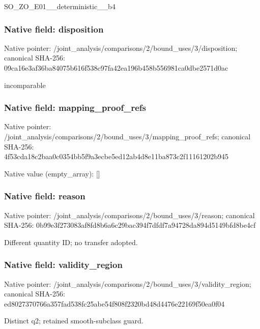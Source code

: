 \documentclass[10pt,a4paper]{article}
\begin{document}
\begingroup\raggedright\sloppy SO\_\allowbreak{}ZO\_\allowbreak{}E01\_\allowbreak{}\_\allowbreak{}deterministic\_\allowbreak{}\_\allowbreak{}b4\par\endgroup

\subsubsection{Native field: disposition}
Native pointer: /joint\_\allowbreak{}analysis/comparisons/2/bound\_\allowbreak{}uses/3/disposition; canonical SHA-256: 09ca16e3af36ba84075b616f538c97fa42ea196b458b556981ca0dbe2571d0ac

\begingroup\raggedright\sloppy incomparable\par\endgroup

\subsubsection{Native field: mapping\_\allowbreak{}proof\_\allowbreak{}refs}
Native pointer: /joint\_\allowbreak{}analysis/comparisons/2/bound\_\allowbreak{}uses/3/mapping\_\allowbreak{}proof\_\allowbreak{}refs; canonical SHA-256: 4f53cda18c2baa0c0354bb5f9a3ecbe5ed12ab4d8e11ba873c2f11161202b945

Native value (empty\_\allowbreak{}array): []

\subsubsection{Native field: reason}
Native pointer: /joint\_\allowbreak{}analysis/comparisons/2/bound\_\allowbreak{}uses/3/reason; canonical SHA-256: 0b99e3f273083af8fd8b6a6c29bac394f7dfdf7a94728da894d5149bfd8be4cf

\begingroup\raggedright\sloppy Different quantity ID;\allowbreak{} no transfer adopted.\par\endgroup

\subsubsection{Native field: validity\_\allowbreak{}region}
Native pointer: /joint\_\allowbreak{}analysis/comparisons/2/bound\_\allowbreak{}uses/3/validity\_\allowbreak{}region; canonical SHA-256: ed8027370766a357fad538fc25abe54f808f2320bd48d4476e22169f50ea0f04

\begingroup\raggedright\sloppy Distinct q2;\allowbreak{} retained smooth-subclass guard.\par\endgroup
\end{document}
